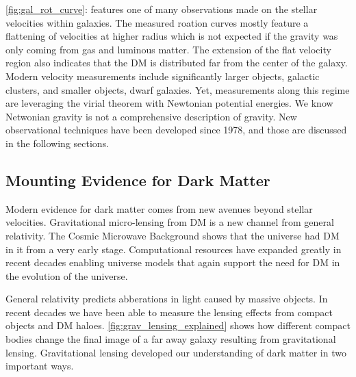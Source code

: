 \cref{fig:gal_rot_curve}: features one of many observations made on the stellar velocities within galaxies.
The measured roation curves mostly feature a flattening of velocities at higher radius which is not expected if the gravity was only coming from gas and luminous matter.
The extension of the flat velocity region also indicates that the DM is distributed far from the center of the galaxy.
Modern velocity measurements include significantly larger objects, galactic clusters, and smaller objects, dwarf galaxies.
Yet, measurements along this regime are leveraging the virial theorem with Newtonian potential energies.
We know Netwonian gravity is not a comprehensive description of gravity.
New observational techniques have been developed since 1978, and those are discussed in the following sections.

\subsection{Mounting Evidence for Dark Matter\label{sec:ev4dm_more}}

Modern evidence for dark matter comes from new avenues beyond stellar velocities.
Gravitational micro-lensing from DM is a new channel from general relativity.
The Cosmic Microwave Background shows that the universe had DM in it from a very early stage.
Computational resources have expanded greatly in recent decades enabling universe models that again support the need for DM in the evolution of the universe.

General relativity predicts abberations in light caused by massive objects.
In recent decades we have been able to measure the lensing effects from compact objects and DM haloes.
\cref{fig:grav_lensing_explained} shows how different compact bodies change the final image of a far away galaxy resulting from gravitational lensing.
Gravitational lensing developed our understanding of dark matter in two important ways.

